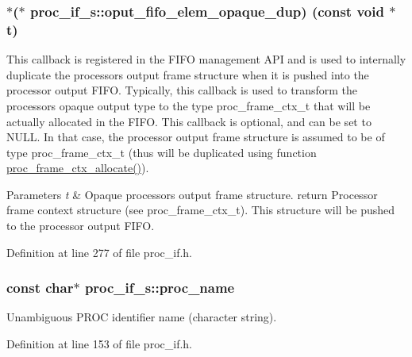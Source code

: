 \subsubsection[{\texorpdfstring{oput\+\_\+fifo\+\_\+elem\+\_\+opaque\+\_\+dup}{oput_fifo_elem_opaque_dup}}]{$\ast$($\ast$ proc\+\_\+if\+\_\+s\+::oput\+\_\+fifo\+\_\+elem\+\_\+opaque\+\_\+dup) (const void $\ast$t)}\hypertarget{structproc__if__s_a7806bbda25988d9ee54f6d0bb143c697}{}\label{structproc__if__s_a7806bbda25988d9ee54f6d0bb143c697}
This callback is registered in the F\+I\+FO management A\+PI and is used to internally duplicate the processor\textquotesingle{}s output frame structure when it is pushed into the processor output F\+I\+FO. Typically, this callback is used to transform the processor\textquotesingle{}s opaque output type to the type proc\+\_\+frame\+\_\+ctx\+\_\+t that will be actually allocated in the F\+I\+FO. This callback is optional, and can be set to N\+U\+LL. In that case, the processor output frame structure is assumed to be of type proc\+\_\+frame\+\_\+ctx\+\_\+t (thus will be duplicated using function \textquotesingle{}\hyperlink{proc__if_8c_a26df07b260850afd03ec73572608a034}{proc\+\_\+frame\+\_\+ctx\+\_\+allocate()}\textquotesingle{}). 
\begin{DoxyParams}{Parameters}
{\em t} & Opaque processor\textquotesingle{}s output frame structure. return Processor frame context structure (see proc\+\_\+frame\+\_\+ctx\+\_\+t). This structure will be pushed to the processor output F\+I\+FO. \\
\hline
\end{DoxyParams}


Definition at line 277 of file proc\+\_\+if.\+h.

\subsubsection[{\texorpdfstring{proc\+\_\+name}{proc_name}}]{\setlength{\rightskip}{0pt plus 5cm}const char$\ast$ proc\+\_\+if\+\_\+s\+::proc\+\_\+name}\hypertarget{structproc__if__s_aa284f1d0bdde2fae0b51101f658430ee}{}\label{structproc__if__s_aa284f1d0bdde2fae0b51101f658430ee}
Unambiguous P\+R\+OC identifier name (character string). 

Definition at line 153 of file proc\+\_\+if.\+h.

